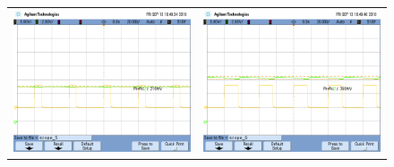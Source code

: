 \begin{figure}[H]
    \centering
    \begin{tabular}{c c}
        \includegraphics[scale=0.2]{../Mediciones/Osciloscopio/Barrido_Duty/scope_5.png} & 
        \includegraphics[scale=0.2]{../Mediciones/Osciloscopio/Barrido_Duty/scope_6.png} \\

\end{tabular}
\end{figure}
